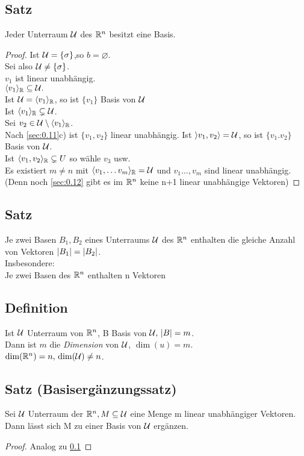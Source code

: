 \subsection{Satz}\label{sec:0.15}
Jeder Unterraum $\mathcal{U}$ des $\mathbb{R}^n$ besitzt eine Basis.
\begin{proof}
Ist $\mathcal{U} = \{\sigma\}$,so $b = \varnothing$.\\
Sei also $\mathcal{U} \ne \{\sigma\}$.\\
$v_1$ ist linear unabhängig.\\
$\langle v_1\rangle_{\mathbb{R}} \subseteq \mathcal{U}.$\\
Ist $\mathcal{U} = \langle v_1 \rangle_{\mathbb{R}}$, so ist $\{ v_1 \}$ Basis von $\mathcal{U}$\\
Ist $\langle v_1 \rangle_{\mathbb{R}} \subsetneq \mathcal{U}$.\\
Sei $v_2 \in \mathcal{U} \setminus \langle v_1 \rangle_{\mathbb{R}}$.\\
Nach \ref{sec:0.11}c) ist $\{ v_1,v_2 \}$ linear unabhängig. Ist $\rangle v_1,v_2 \rangle = \mathcal{U}$, so ist $\{ v_1.v_2 \}$ Basis von $\mathcal{U}$.\\
Ist $\langle v_1, v_2 \rangle_{\mathbb{R}} \subsetneq U$ so wähle $v_3$ usw.\\
Es existiert $m \ne n$ mit $\langle v_1,\ldots v_m\rangle_{\mathbb{R}} = \mathcal{U}$ und $v_1\ldots,v_m$ sind linear unabhängig.\\
(Denn noch \ref{sec:0.12} gibt es im $\mathbb{R}^n$ keine n+1 linear unabhängige Vektoren)
\end{proof}
\subsection{Satz}\label{sec:0.16}
Je zwei Basen $B_1,B_2$ eines Unterraums $\mathcal{U}$ des $\mathbb{R}^n$ enthalten die gleiche Anzahl von Vektoren $\lvert B_1 \rvert = \lvert B_2 \rvert$.\\
Insbesondere:\\
Je zwei Basen des $\mathbb{R}^n$ enthalten n Vektoren
\subsection{Definition}\label{sec:0.17}
Ist $\mathcal{U}$ Unterraum von $\mathbb{R}^n$, B Basis von $\mathcal{U},\, \lvert B \rvert = m$.\\
Dann ist $m$ die \emph{Dimension} von $\mathcal{U}$, $\dim(u) = m.$\\
$\dim(\mathbb{R}^n) = n,\, \dim(\mathcal{U}) \ne n$.
\subsection{Satz (Basisergänzungssatz)}\label{sec:0.18}
Sei $\mathcal{U}$ Unterraum der $\mathbb{R}^n, M \subseteq \mathcal{U}$ eine Menge m linear unabhängiger Vektoren. Dann lässt sich M zu einer Basis von $\mathcal{U}$ ergänzen.
\begin{proof}
Analog zu \ref{sec:0.15}
\end{proof}
